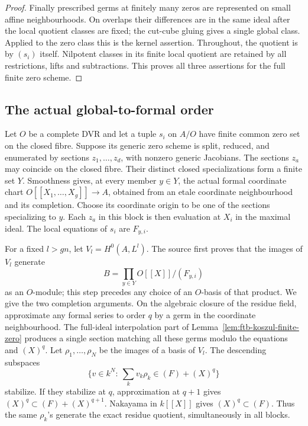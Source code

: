 \begin{proof}
Finally prescribed germs at finitely many zeros are represented
on small affine neighbourhoods.  On overlaps their differences
are in the same ideal after the local quotient classes are fixed;
the cut-cube gluing gives a single global class.
Applied to the zero class this is the kernel assertion.
Throughout, the quotient is by \((s_i)\) itself.
Nilpotent classes in its finite local quotient are retained by
all restrictions, lifts and subtractions.
This proves all three assertions for the full finite zero scheme.
\end{proof}

\subsection{The actual global-to-formal order}
Let \(O\) be a complete DVR and let a tuple \(s_i\) on \(A/O\)
have finite common zero set on the closed fibre.
Suppose its generic zero scheme is split, reduced, and enumerated
by sections \(z_1,\ldots,z_d\), with nonzero generic Jacobians.
The sections \(z_a\) may coincide on the closed fibre.
Their distinct closed specializations form a finite set \(Y\).
Smoothness gives, at every member \(y\in Y\), the actual formal
coordinate chart \(O[[X_1,\ldots,X_g]]\to A\), obtained from an
etale coordinate neighbourhood and its completion.
Choose its coordinate origin to be one of the sections specializing
to \(y\).  Each \(z_a\) in this block is then evaluation at
\(X_i\) in the maximal ideal.  The local equations of \(s_i\)
are \(F_{y,i}\).

For a fixed \(l>gn\), let \(V_l=H^0(A,L^l)\).
The source first proves that the images of \(V_l\) generate
\[
                 B=\prod_{y\in Y}O[[X]]/(F_{y,i})
 \tag{K16}\label{eq:ftb-local-order}
\]
as an \(O\)-module; this step precedes any choice of an \(O\)-basis
of that product.  We give the two completion arguments.
On the algebraic closure of the residue field, approximate any
formal series to order \(q\) by a germ in the coordinate
neighbourhood.  The full-ideal interpolation part of
Lemma~\ref{lem:ftb-koszul-finite-zero}
produces a single section matching all these germs modulo the
equations and \((X)^q\).
Let \(\rho_1,\ldots,\rho_N\) be the images of a basis of \(V_l\).
The descending subspaces
\[
 \{v\in k^N:\ \sum_kv_k\rho_k\in(F)+(X)^q\}
\]
stabilize.  If they stabilize at \(q\), approximation at \(q+1\)
gives \((X)^q\subset(F)+(X)^{q+1}\).
Nakayama in \(k[[X]]\) gives \((X)^q\subset(F)\).
Thus the same \(\rho_k\)'s generate the exact residue quotient,
simultaneously in all blocks.

